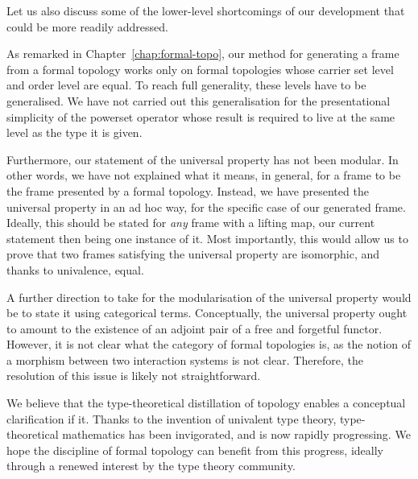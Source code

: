Let us also discuss some of the lower-level shortcomings of our development that could be
more readily addressed.

As remarked in Chapter~\ref{chap:formal-topo}, our method for generating a frame from a
formal topology works only on formal topologies whose carrier set level and order level
are equal. To reach full generality, these levels have to be generalised. We have not
carried out this generalisation for the presentational simplicity of the powerset operator
whose result is required to live at the same level as the type it is given.

Furthermore, our statement of the universal property has not been modular. In other words,
we have not explained what it means, in general, for a frame to be the frame presented by
a formal topology. Instead, we have presented the universal property in an ad hoc way, for
the specific case of our generated frame. Ideally, this should be stated for \emph{any}
frame with a lifting map, our current statement then being one instance of it. Most
importantly, this would allow us to prove that two frames satisfying the universal
property are isomorphic, and thanks to univalence, equal.

A further direction to take for the modularisation of the universal property would be to
state it using categorical terms. Conceptually, the universal property ought to amount to
the existence of an adjoint pair of a free and forgetful functor. However, it is not clear
what the category of formal topologies is, as the notion of a morphism between two
interaction systems is not clear. Therefore, the resolution of this issue is likely not
straightforward.

We believe that the type-theoretical distillation of topology enables a conceptual
clarification if it. Thanks to the invention of univalent type theory, type-theoretical
mathematics has been invigorated, and is now rapidly progressing. We hope the discipline
of formal topology can benefit from this progress, ideally through a renewed interest by
the type theory community.
